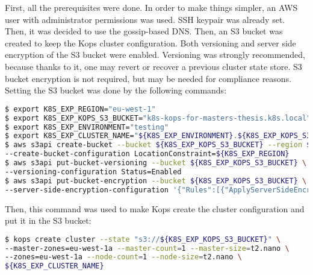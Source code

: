 First, all the prerequisites were done. In order to make things simpler, an AWS user with administrator permissions was used. SSH keypair was already set. Then, it was decided to use the gossip-based DNS. Then, an S3 bucket was created to keep the Kops cluster configuration. Both versioning and server side encryption of the S3 bucket were enabled. Versioning was strongly recommended, because thanks to it, one may revert or recover a previous cluster state store. S3 bucket encryption is not required, but may be needed for compliance reasons\cite{online-kops-aws}. Setting the S3 bucket was done by the following commands:
\begin{lstlisting}[basicstyle=\tiny,caption={Commands used to set an AWS S3 bucket for Kops},captionpos=b,language=Bash,xleftmargin=1cm]
$ export K8S_EXP_REGION="eu-west-1"
$ export K8S_EXP_KOPS_S3_BUCKET="k8s-kops-for-masters-thesis.k8s.local"
$ export K8S_EXP_ENVIRONMENT="testing"
$ export K8S_EXP_CLUSTER_NAME="${K8S_EXP_ENVIRONMENT}.${K8S_EXP_KOPS_S3_BUCKET}"
$ aws s3api create-bucket --bucket ${K8S_EXP_KOPS_S3_BUCKET} --region ${K8S_EXP_REGION} \
--create-bucket-configuration LocationConstraint=${K8S_EXP_REGION}
$ aws s3api put-bucket-versioning --bucket ${K8S_EXP_KOPS_S3_BUCKET} \
--versioning-configuration Status=Enabled
$ aws s3api put-bucket-encryption --bucket ${K8S_EXP_KOPS_S3_BUCKET} \
--server-side-encryption-configuration '{"Rules":[{"ApplyServerSideEncryptionByDefault":{"SSEAlgorithm":"AES256"}}]}'
\end{lstlisting}

Then, this command was used to make Kops create the cluster configuration and put it in the S3 bucket:
\begin{lstlisting}[basicstyle=\small,caption={Command used to make Kops create the cluster configuration and put it in the S3 bucket},captionpos=b,language=Bash,xleftmargin=1cm]
$ kops create cluster --state "s3://${K8S_EXP_KOPS_S3_BUCKET}" \
--master-zones=eu-west-1a --master-count=1 --master-size=t2.nano \
--zones=eu-west-1a --node-count=1 --node-size=t2.nano \
${K8S_EXP_CLUSTER_NAME}
\end{lstlisting}

